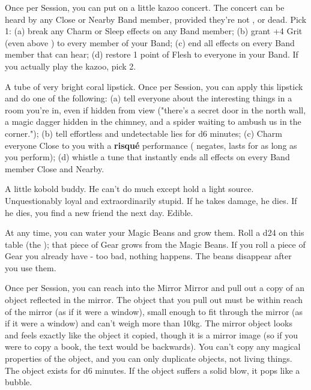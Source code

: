 \begin{multicols*}{2}

Once per Session, you can put on a little kazoo concert. The concert can be heard by any Close or Nearby Band member, provided they're not , or dead.  Pick 1:  (a) break any Charm or Sleep effects on any Band member; (b) grant +4 Grit (even above \MAX) to every member of your Band; (c) end all \Duration effects on every Band member that can hear; (d) restore 1 point of Flesh to everyone in your Band.  If you actually play the kazoo, pick 2.


A tube of very bright coral lipstick.  Once per Session, you can apply this lipstick and do one of the following:  (a) tell everyone about the interesting things in a room you're in, even if hidden from view ("there's a secret door in the north wall, a magic dagger hidden in the chimney, and a spider waiting to ambush us in the corner."); (b) tell effortless and undetectable lies for d6 minutes;  (c) Charm everyone Close to you with a {\selectfont \bfseries{risqué}} performance ( negates, lasts for as long as you perform); (d) whistle a tune that instantly ends all \Duration effects on every Band member Close and Nearby.



A little kobold buddy. He can't do much except hold a light source.  Unquestionably loyal and extraordinarily stupid.  If he takes damage, he dies. If he dies, you find a new friend the next day.  Edible.


At any time, you can water your Magic Beans and grow them.  Roll a d24 on this table (the ); that piece of Gear grows from the Magic Beans.  If you roll a piece of Gear you already have - too bad, nothing happens. The beans disappear after you use them.



Once per Session, you can reach into the Mirror Mirror and pull out a copy of an object reflected in the mirror.  The object that you pull out must be within reach of the mirror (as if it were a window), small enough to fit through the mirror (as if it were a window) and can’t weigh more than 10kg. The mirror object looks and feels exactly like the object it copied, though it is a mirror image (so if you were to copy a book, the text would be backwards). You can’t copy any magical properties of the object, and you can only duplicate objects, not living things. The object exists for d6 minutes. If the object suffers a solid blow, it pops like a bubble.



\end{multicols*}

